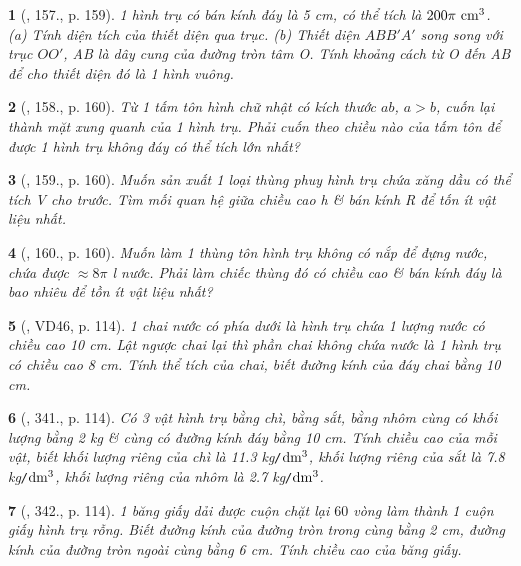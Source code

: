 \documentclass{article}
\newtheorem{baitoan}{}
\begin{document}
\begin{baitoan}[\cite{Tuyen_Toan_9_old}, 157., p. 159]
	1 hình trụ có bán kính đáy là {\rm5 cm}, có thể tích là $200\pi\ {\rm cm}^3$. (a) Tính diện tích của thiết diện qua trục. (b) Thiết diện $ABB'A'$ song song với trục $OO'$, AB là dây cung của đường tròn tâm O. Tính khoảng cách từ O đến AB để cho thiết diện đó là 1 hình vuông.
\end{baitoan}

\begin{baitoan}[\cite{Tuyen_Toan_9_old}, 158., p. 160]
	Từ 1 tấm tôn hình chữ nhật có kích thước $ab$, $a > b$, cuốn lại thành mặt xung quanh của 1 hình trụ. Phải cuốn theo chiều nào của tấm tôn để được 1 hình trụ không đáy có thể tích lớn nhất?
\end{baitoan}

\begin{baitoan}[\cite{Tuyen_Toan_9_old}, 159., p. 160]
	Muốn sản xuất 1 loại thùng phuy hình trụ chứa xăng dầu có thể tích V cho trước. Tìm mối quan hệ giữa chiều cao h \& bán kính R để tốn ít vật liệu nhất.
\end{baitoan}

\begin{baitoan}[\cite{Tuyen_Toan_9_old}, 160., p. 160]
	Muốn làm 1 thùng tôn hình trụ không có nắp để đựng nước, chứa được $\approx8\pi$ {\rm l} nước. Phải làm chiếc thùng đó có chiều cao \& bán kính đáy là bao nhiêu để tồn ít vật liệu nhất?
\end{baitoan}

\begin{baitoan}[\cite{Binh_Toan_9_tap_2}, VD46, p. 114]
	1 chai nước có phía dưới là hình trụ chứa 1 lượng nước có chiều cao {\rm10 cm}. Lật ngược chai lại thì phần chai không chứa nước là 1 hình trụ có chiều cao {\rm8 cm}. Tính thể tích của chai, biết đường kính của đáy chai bằng {\rm10 cm}.
\end{baitoan}

\begin{baitoan}[\cite{Binh_Toan_9_tap_2}, 341., p. 114]
	Có 3 vật hình trụ bằng chì, bằng sắt, bằng nhôm cùng có khối lượng bằng {\rm2 kg} \& cùng có đường kính đáy bằng {\rm10 cm}. Tính chiều cao của mỗi vật, biết khối lượng riêng của chì là {\rm11.3 kg{\tt/}$\rm dm^3$}, khối lượng riêng của sắt là {\rm7.8 kg{\tt/}$\rm dm^3$}, khối lượng riêng của nhôm là {\rm2.7 kg{\tt/}$\rm dm^3$}.
\end{baitoan}

\begin{baitoan}[\cite{Binh_Toan_9_tap_2}, 342., p. 114]
	1 băng giấy dải được cuộn chặt lại $60$ vòng làm thành 1 cuộn giấy hình trụ rỗng. Biết đường kính của đường tròn trong cùng bằng {\rm2 cm}, đường kính của đường tròn ngoài cùng bằng {\rm6 cm}. Tính chiều cao của băng giấy.
\end{baitoan}
\end{document}

